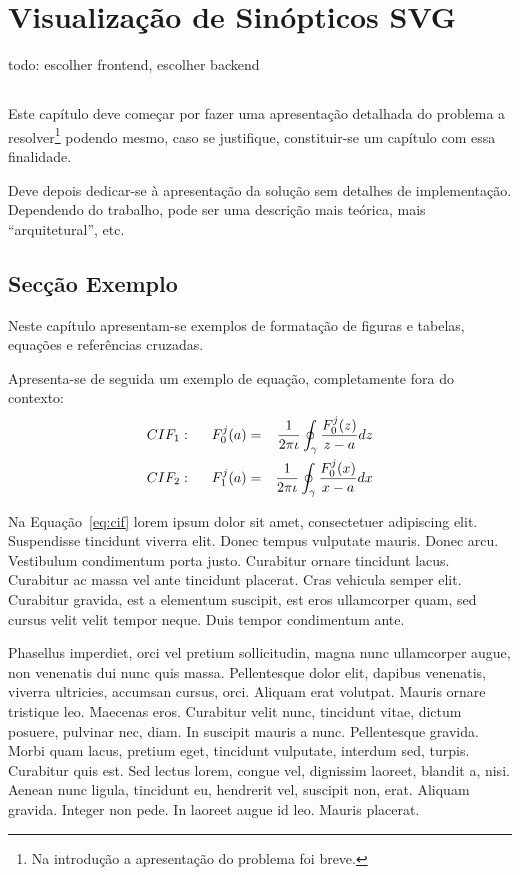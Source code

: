 \chapter{Visualização de Sinópticos SVG}\label{chap:chap3}

todo: escolher frontend, escolher backend

\section*{}

Este capítulo deve começar por fazer uma apresentação detalhada do
problema a resolver\footnote{Na introdução a apresentação do
  problema foi breve.} podendo mesmo, caso se justifique,
constituir-se um capítulo com essa finalidade.

Deve depois dedicar-se à apresentação da solução sem detalhes de
implementação.
Dependendo do trabalho, pode ser uma descrição mais teórica, mais
``arquitetural'', etc.

\section{Secção Exemplo}

Neste capítulo apresentam-se exemplos de formatação de figuras e
tabelas, equações e referências cruzadas.

Apresenta-se de seguida um exemplo de equação, completamente fora do contexto:
\begin{eqnarray}
CIF_1: \hspace*{5mm}F_0^j(a) &=& \frac{1}{2\pi \iota} \oint_{\gamma} \frac{F_0^j(z)}{z - a} dz\\
CIF_2: \hspace*{5mm}F_1^j(a) &=& \frac{1}{2\pi \iota} \oint_{\gamma} \frac{F_0^j(x)}{x - a} dx \label{eq:cif}
\end{eqnarray}

Na Equação~\ref{eq:cif} lorem ipsum dolor sit amet, consectetuer
adipiscing elit. Suspendisse tincidunt viverra elit. Donec tempus
vulputate mauris. Donec arcu. Vestibulum condimentum porta
justo. Curabitur ornare tincidunt lacus. Curabitur ac massa vel ante
tincidunt placerat. Cras vehicula semper elit. Curabitur gravida, est
a elementum suscipit, est eros ullamcorper quam, sed cursus velit
velit tempor neque. Duis tempor condimentum ante.

Phasellus imperdiet, orci vel pretium sollicitudin, magna nunc
ullamcorper augue, non venenatis dui nunc quis massa. Pellentesque
dolor elit, dapibus venenatis, viverra ultricies, accumsan cursus,
orci. Aliquam erat volutpat. Mauris ornare tristique leo. Maecenas
eros. Curabitur velit nunc, tincidunt vitae, dictum posuere, pulvinar
nec, diam. In suscipit mauris a nunc. Pellentesque gravida. Morbi quam
lacus, pretium eget, tincidunt vulputate, interdum sed,
turpis. Curabitur quis est. Sed lectus lorem, congue vel, dignissim
laoreet, blandit a, nisi. Aenean nunc ligula, tincidunt eu, hendrerit
vel, suscipit non, erat. Aliquam gravida. Integer non pede. In laoreet
augue id leo. Mauris placerat.

